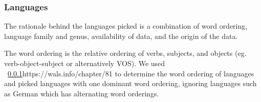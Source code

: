 %
%
%
%
%


\subsubsection{Languages}

The rationale behind the languages picked is a combination of word ordering,
language family and genus, availability of data, and the origin of the data.

The word ordering is the relative ordering of verbs, subjects, and objects (eg.
verb-object-subject or alternatively VOS). We used
~\ref{}{https://wals.info/chapter/81} to determine the word ordering of
languages and picked languages with one dominant word ordering, ignoring
languages such as German which has alternating word orderings. 

